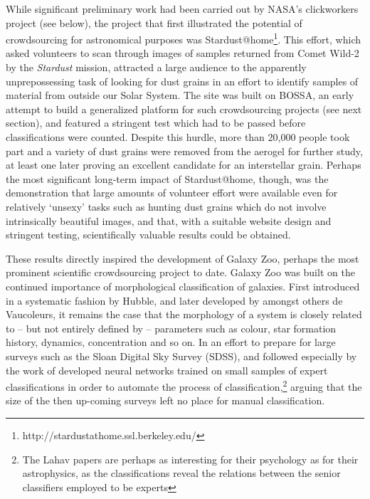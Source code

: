 \documentclass{ar2e}
\begin{document}
While significant preliminary work had been carried out by NASA's clickworkers
project (see below), the project that first illustrated the potential of
crowdsourcing for astronomical purposes was Stardust@home\footnote{http://stardustathome.ssl.berkeley.edu/}. This effort, which
asked volunteers to scan through images of samples returned from Comet Wild-2
by the \emph{Stardust} mission, attracted a large audience to the apparently
unprepossessing task of looking for dust grains in an effort to identify
samples of material from outside our Solar System. The site was built on
BOSSA, an early attempt to build a generalized platform for such crowdsourcing
projects (see next section), and featured a stringent test which had to be
passed before classifications were counted. Despite this hurdle, more than
20,000 people took part and a variety of dust grains were removed from the
aerogel for further study, at least one later proving an excellent candidate
for an interstellar grain. Perhaps the most significant long-term impact of
Stardust@home, though, was the demonstration that large amounts of volunteer
effort were available even for relatively `unsexy' tasks such as hunting dust
grains which do not involve intrinsically beautiful images, and that, with a
suitable website design and stringent testing, scientifically valuable results
could be obtained. 



These results directly inspired the development of Galaxy Zoo, perhaps the most
prominent scientific crowdsourcing project to date. Galaxy Zoo was built on the
continued importance of morphological classification of galaxies. First
introduced in a systematic fashion by Hubble, and later developed by amongst
others de Vaucoleurs, it remains the case that the morphology of a system is
closely related to -- but not entirely defined by -- parameters such as colour,
star formation history, dynamics, concentration and so on.  In an effort to
prepare for large surveys such as the Sloan Digital Sky Survey (SDSS), \citet{Lahav1995} and \citet{Lahav1996} followed especially by the work of \citet{Ball} developed neural networks
trained on small samples of expert classifications in order to automate the
process of classification,\footnote{The Lahav papers are perhaps as interesting
for their psychology as for their astrophysics, as the classifications reveal
the relations between the senior classifiers employed to be experts} arguing
that the size of the then up-coming surveys left no place for manual
classification.
\end{document}
